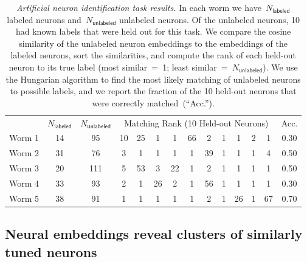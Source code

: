 \documentclass{article}
\begin{document}
\begin{table}[h]
  \caption{\textit{Artificial neuron identification task results.}  In
    each worm we have~$N_{\mathsf{labeled}}$ labeled neurons
    and~$N_{\mathsf{unlabeled}}$ unlabeled neurons. Of the unlabeled
    neurons, 10 had known labels that were held out for this task.  We
    compare the cosine similarity of the unlabeled neuron embeddings
    to the embeddings of the labeled neurons, sort the similarities,
    and compute the rank of each held-out neuron to its true label
    (most similar~=~1; least similar~=~$N_{\mathsf{unlabeled}}$).  We
    use the Hungarian algorithm to find the most likely matching of
    unlabeled neurons to possible labels, and we report the fraction
    of the 10 held-out neurons that were correctly matched~(``Acc.'').
  }
  \vspace{1em}
  \label{tab:neuron_id}
  \centering
  \begin{tabular}{cccccccccccccc}
    \toprule
    & $N_{\mathsf{labeled}}$ & $N_{\mathsf{unlabeled}}$ & \multicolumn{10}{c}{Matching Rank (10 Held-out Neurons)} & Acc. \\
    \cmidrule(r){2-2}
    \cmidrule(rl){3-3}
    \cmidrule(rl){4-13}
    \cmidrule(l){14-14}
    Worm 1 & 14 & 95 & 10 & 25 & 1 & 1 & 66 & 2 & 1 & 1 & 2 & 1 & 0.30 \\
    Worm 2 & 31 & 76 & 3 & 1 & 1 & 1 & 1 & 39 & 1 & 1 & 1 & 4 & 0.50 \\
    Worm 3 & 20 & 111 & 5 & 53 & 3 & 22 & 1 & 2 & 1 & 1 & 1 & 1 & 0.50 \\
    Worm 4 &33 & 93 & 2 & 1 & 26 & 2 & 1 & 56 & 1 & 1 & 1 & 1 & 0.30 \\
    Worm 5 & 38 & 91 & 1 & 1 & 1 & 1 & 1 & 2 & 1 & 26 & 1 & 67 & 0.70 \\
    \bottomrule
  \end{tabular}
\end{table}

\clearpage

\subsection{Neural embeddings reveal clusters of similarly tuned neurons}
\end{document}
